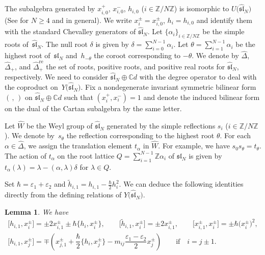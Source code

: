 \documentclass[10pt,a4paper]{amsart}
\newtheorem{lem}[thm]{Lemma}
\theoremstyle{definition}
\numberwithin{equation}{section}
\newcommand{\ve}{\varepsilon}
\newcommand{\bbZ}{\mathbb{Z}}
\newcommand{\bbC}{\mathbb{C}}
\newcommand{\affY}{Y\big(\affsl\big)}
\newcommand{\affsl}{\hat{\mathfrak{sl}}_N}
\begin{document}
The subalgebra generated by $x_{i,0}^+$, $x_{i,0}^-$, $h_{i,0}$ ($i \in \bbZ / N\bbZ$) is isomorphic to $U\big(\affsl\big)$ (See \cite[Theorem~6.1]{MR2323534} for $N \geq 4$ and \cite[Theorem~6.9]{GRW} in general). We write $x_{i}^{\pm} = x_{i,0}^{\pm}$, $h_{i} = h_{i,0}$ and identify them with the standard Chevalley generators of $\affsl$. Let $\{\alpha_i\}_{i \in \bbZ/N\bbZ}$ be the simple roots of~$\affsl$. The null root $\delta$ is given by $\delta=\sum\limits_{i=0}^{N-1} \alpha_i$. Let $\theta = \sum\limits_{i=1}^{N-1} \alpha_i$ be the highest root of~$\mathfrak{sl}_N$ and~$h_{-\theta}$ the coroot corresponding to $-\theta$. We denote by $\hat{\Delta}$, $\hat{\Delta}_+$, and $\hat{\Delta}_+^{\mathrm{re}}$ the set of roots, positive roots, and positive real roots for $\affsl$, respectively. We need to consider $\affsl \oplus \bbC d$ with the degree operator to deal with the coproduct on~$\affY$. Fix a nondegenerate invariant symmetric bilinear form $(\, ,\, )$ on $\affsl \oplus \bbC d$ such that $(x_i^+,x_i^-)=1$ and denote the induced bilinear form on the dual of the Cartan subalgebra by the same letter.

Let $\hat{W}$ be the Weyl group of $\affsl$ generated by the simple reflections $s_i$ ($i \in \bbZ/N\bbZ$). We denote by~$s_{\theta}$ the reflection corresponding to the highest root $\theta$. For each $\alpha \in \hat{\Delta}$, we assign the translation element $t_{\alpha}$ in $\hat{W}$. For example, we have $s_0 s_{\theta} = t_{\theta}$. The action of $t_{\alpha}$ on the root lattice $Q=\sum\limits_{i=1}^{N-1} \bbZ \alpha_i$ of $\mathfrak{sl}_N$ is given by $t_{\alpha}(\lambda) = \lambda - (\alpha,\lambda)\delta$ for $\lambda \in Q$.

Set $\hbar = \ve_1 + \ve_2$ and $\tilde{h}_{i,1} = h_{i,1} - \frac{\hbar}{2} h_{i}^2$. We can deduce the following identities directly from the defining relations of $\affY$.
\begin{lem}\label{lem:relations}
We have
\begin{gather*}
\big[h_{i,1}, x_{i}^{\pm}\big] = \pm2 x_{i,1}^{\pm} \pm \hbar \big\{h_i,x_i^{\pm}\big\}, \qquad \big[\tilde{h}_{i,1}, x_{i}^{\pm}\big] = \pm2 x_{i,1}^{\pm}, \qquad \big[x_{i,1}^{\pm},x_i^{\pm}\big] = \pm \hbar \big(x_i^{\pm}\big)^2,\\
\big[h_{i,1}, x_{j}^{\pm}\big] = \mp \left( x_{j,1}^{\pm} + \dfrac{\hbar}{2} \big\{h_i,x_j^{\pm}\big\} - m_{ij} \dfrac{\ve_1-\ve_2}{2}x_j^{\pm} \right) \qquad \text{if} \quad i=j \pm 1.
\end{gather*}
\end{lem}
\end{document}
